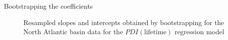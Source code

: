 \begin{frame}[label=intro-tc]{Bootstrapping the coefficients}
	\begin{figure}[H]
		\centering
		\caption{Resampled slopes and intercepts obtained by bootstrapping for the North Atlantic basin data for the $PDI(\text{lifetime})$ regression model}
		\label{fig:natl-boot-coefs}
	\end{figure}
\end{frame}

